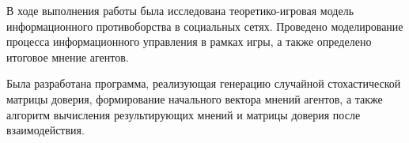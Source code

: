 \conclusion

В ходе выполнения работы была исследована теоретико-игровая модель информационного противоборства в социальных сетях. Проведено моделирование процесса информационного управления в рамках игры, а также определено итоговое мнение агентов.

Была разработана программа, реализующая генерацию случайной стохастической матрицы доверия, формирование начального вектора мнений агентов, а также алгоритм вычисления результирующих мнений и матрицы доверия после взаимодействия.
